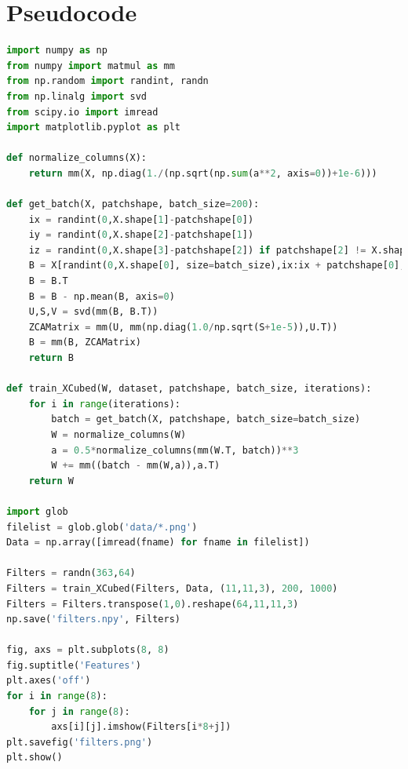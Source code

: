 \documentclass[twocolumn]{article}
\begin{document}
\section{Pseudocode}
\begin{lstlisting}[language=Python]
import numpy as np
from numpy import matmul as mm
from np.random import randint, randn
from np.linalg import svd
from scipy.io import imread
import matplotlib.pyplot as plt

def normalize_columns(X):
    return mm(X, np.diag(1./(np.sqrt(np.sum(a**2, axis=0))+1e-6)))

def get_batch(X, patchshape, batch_size=200):
    ix = randint(0,X.shape[1]-patchshape[0])
    iy = randint(0,X.shape[2]-patchshape[1])
    iz = randint(0,X.shape[3]-patchshape[2]) if patchshape[2] != X.shape[3] else 0
    B = X[randint(0,X.shape[0], size=batch_size),ix:ix + patchshape[0],iy:iy + patchshape[1],iz:iz + patchshape[2]].reshape(batch_size, patchshape[0]*patchshape[1]*patchshape[2])
    B = B.T
    B = B - np.mean(B, axis=0)
    U,S,V = svd(mm(B, B.T))
    ZCAMatrix = mm(U, mm(np.diag(1.0/np.sqrt(S+1e-5)),U.T))
    B = mm(B, ZCAMatrix)
    return B

def train_XCubed(W, dataset, patchshape, batch_size, iterations):
    for i in range(iterations):
        batch = get_batch(X, patchshape, batch_size=batch_size)
        W = normalize_columns(W)
        a = 0.5*normalize_columns(mm(W.T, batch))**3
        W += mm((batch - mm(W,a)),a.T)
    return W

import glob
filelist = glob.glob('data/*.png')
Data = np.array([imread(fname) for fname in filelist])

Filters = randn(363,64)
Filters = train_XCubed(Filters, Data, (11,11,3), 200, 1000)
Filters = Filters.transpose(1,0).reshape(64,11,11,3)
np.save('filters.npy', Filters)

fig, axs = plt.subplots(8, 8)
fig.suptitle('Features')
plt.axes('off')
for i in range(8):
    for j in range(8):
        axs[i][j].imshow(Filters[i*8+j])
plt.savefig('filters.png')
plt.show()
\end{lstlisting}
\nocite{*}


\end{document}
